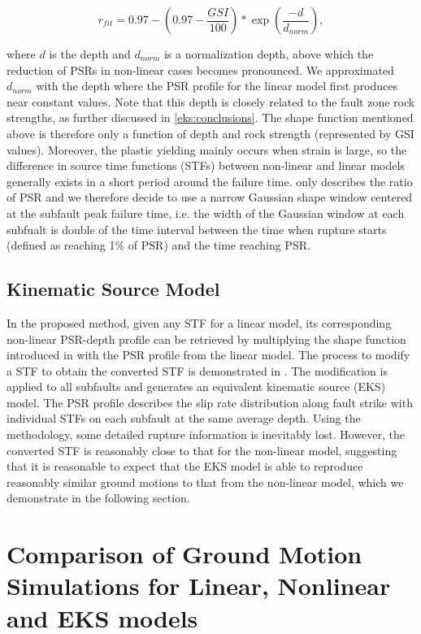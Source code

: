 \begin{equation}\label{eq:eks-2}
    r_{f i t}=0.97 - \left(0.97-\frac{G S I}{100}\right) * \exp \left(\frac{-d}{d_{norm }}\right),
\end{equation}

where $d$ is the depth and $d_{norm}$ is a normalization depth, above which the reduction of PSRs in non-linear cases becomes pronounced. We approximated $d_{norm}$ with the depth where the PSR profile for the linear model first produces near constant values. Note that this depth is closely related to the fault zone rock strengths, as further discussed in \cref{eks:conclusions}. The shape function mentioned above is therefore only a function of depth and rock strength (represented by GSI values). Moreover, the plastic yielding mainly occurs when strain is large, so the difference in source time functions (STFs) between non-linear and linear models generally exists in a short period around the failure time.  only describes the ratio of PSR and we therefore decide to use a narrow Gaussian shape window centered at the subfault peak failure time, i.e. the width of the Gaussian window at each subfualt is double of the time interval between the time when rupture starts (defined as reaching 1\% of PSR) and the time reaching PSR.

\subsection{Kinematic Source Model}
In the proposed method, given any STF for a linear model, its corresponding non-linear PSR-depth profile can be retrieved by multiplying the shape function introduced in  with the PSR profile from the linear model. 
The process to modify a STF to obtain the converted STF is demonstrated in . The modification is applied to all subfaults and generates an equivalent kinematic source (EKS) model. The PSR profile describes the slip rate distribution along fault strike with individual STFs on each subfault at the same average depth. Using the methodology, some detailed rupture information is inevitably lost. However, the converted STF is reasonably close to that for the non-linear model, suggesting that it is reasonable to expect that the EKS model is able to reproduce reasonably similar ground motions to that from the non-linear model, which we demonstrate in the following section.

\section{Comparison of Ground Motion Simulations for Linear, Nonlinear and EKS models}

